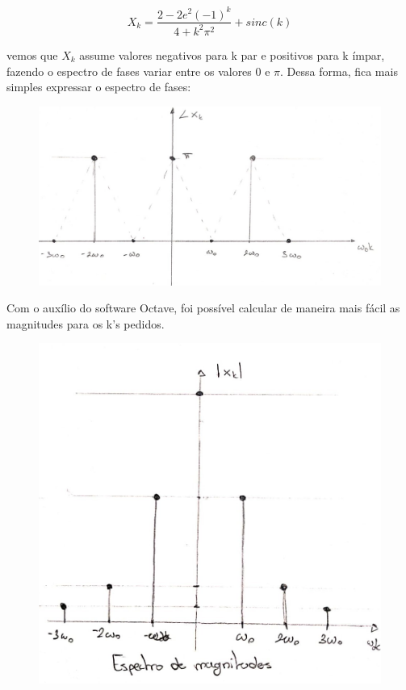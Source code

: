 \documentclass{article}
\begin{document}
\[X_{k} = \frac{2 - 2e^2(-1)^{k}}{4 + k^2\pi^2} + sinc(k)\]

vemos que $X_{k}$ assume valores negativos para k par e positivos para k ímpar, fazendo o espectro de fases variar entre os valores $0$ e $\pi$. Dessa forma, fica mais simples expressar o espectro de fases:

\newpage

\begin{figure}[!ht]
    \includegraphics[scale=0.25]{img3e_fase}
    \centering
\end{figure}

Com o auxílio do software Octave, foi possível calcular de maneira mais fácil as magnitudes para os k's pedidos.

\begin{figure}[!ht]
    \includegraphics[scale=0.25]{img3e_mag}
    \centering
\end{figure}
\end{document}
